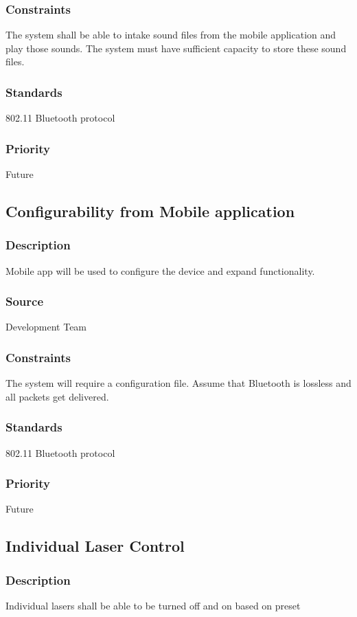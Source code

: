 \subsubsection{Constraints}
The system shall be able to intake sound files from the mobile application and play those sounds. The system must have sufficient capacity to store these sound files.
\subsubsection{Standards}
802.11 Bluetooth protocol
\subsubsection{Priority}
Future

\subsection{Configurability from Mobile application}
\subsubsection{Description}
Mobile app will be used to configure the device and expand functionality.
\subsubsection{Source}
Development Team
\subsubsection{Constraints}
The system will require a configuration file. Assume that Bluetooth is lossless and all packets get delivered.
\subsubsection{Standards}
802.11 Bluetooth protocol
\subsubsection{Priority}
Future

\subsection{Individual Laser Control}
\subsubsection{Description}
Individual lasers shall be able to be turned off and on based on preset
